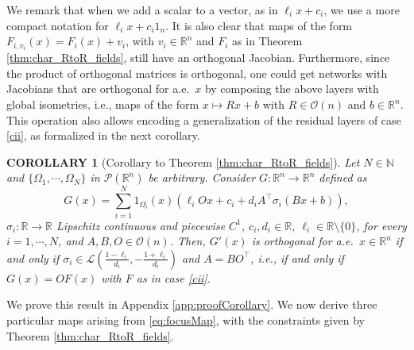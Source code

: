 \documentclass{article}
\newcommand{\R}{\mathbb{R}}
\theoremstyle{plain}
\newtheorem{corollary}[theorem]{COROLLARY}
\theoremstyle{definition}
\theoremstyle{definition}
\theoremstyle{remark}
\newtheorem{remark}[theorem]{REMARK}
\theoremstyle{definition}
\theoremstyle{definition}
\theoremstyle{remark}
\numberwithin{equation}{section}
\begin{document}
We remark that when we add a scalar to a vector, as in $\ell_ix+c_i$, we use a more compact notation for $\ell_ix+c_i1_n$. It is also clear that maps of the form $F_{i,v_i}(x)=F_i(x)+v_i$, with $v_i\in\mathbb{R}^n$ and $F_i$ as in Theorem \ref{thm:char_RtoR_fields}, still have an orthogonal Jacobian. Furthermore, since the product of orthogonal matrices is orthogonal, one could get networks with Jacobians that are orthogonal for a.e.\, $x$ by composing the above layers with global isometries, i.e., maps of the form $x\mapsto Rx+b$ with $R\in\mathcal{O}(n)$ and $b\in\mathbb{R}^n$. This operation also allows encoding a generalization of the residual layers of case \ref{cii}, as formalized in the next corollary.
\begin{corollary}[Corollary to Theorem \ref{thm:char_RtoR_fields}]\label{co:corollary}
Let $N\in\mathbb{N}$ and $\{\Omega_1,\cdots,\Omega_N\}$ in $\mathcal{P}(\mathbb{R}^n)$ be arbitrary. Consider $G:\R^n\to\R^n$ defined as
\[
G(x) = \sum_{i=1}^N1_{\Omega_i}(x)\left(\ell_i Ox + c_i + d_iA^\top \sigma_i(Bx+b)\right),
\]
$\sigma_i:\mathbb{R}\to\mathbb{R}$ Lipschitz continuous and piecewise $C^1$, $c_i,d_i\in\mathbb{R}$, $\ell_i\in\mathbb{R}\setminus\{0\}$, for every $i=1,\cdots,N$, and $A,B,O\in\mathcal{O}(n)$. Then, $G'(x)$ is orthogonal for a.e.\, $x\in\mathbb{R}^n$ if and only if $\sigma_i\in\mathcal{L}\left(\frac{1-\ell_i}{d_i},-\frac{1+\ell_i}{d_i}\right)$ and $A=BO^\top$, i.e., if and only if $G(x)=OF(x)$ with $F$ as in case \ref{cii}.
\end{corollary}
We prove this result in Appendix \ref{app:proofCorollary}. We now derive three particular maps arising from \eqref{eq:focusMap}, with the constraints given by Theorem \ref{thm:char_RtoR_fields}.
\end{document}

